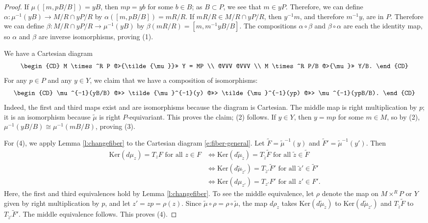 \documentclass[11pt,letterpaper,reqno]{amsart}
\newcommand{\ga}{\alpha}
\numberwithin{equation}{section}
\theoremstyle{plain}
\theoremstyle{definition}
\theoremstyle{remark}
\newcommand{\gb}{\beta}
\begin{document}
\begin{proof}
If $\mu([m, pB/B]) = yB$, then $mp = y b$ for some $b \in B$; as $B \subset P$, we see that $m \in yP$.  Therefore, we can define
$\ga: \mu^{-1}(yB) \to M/R \cap yP/R$ by $\ga([m, pB/B]) = mR/R$.   If $mR/R \in M/R \cap yP/R$,
then $y^{-1}m$, and therefore $m^{-1} y$, are in $P$.  Therefore we can define $\gb: M/R \cap yP/R \to \mu^{-1}(yB)$ by
$\gb(mR/R) = [m, m^{-1} yB/B]$.  The compositions $\ga \circ \gb$ and $\gb \circ \ga$ are each the identity map, so
$\ga$ and $\gb$ are inverse isomorphisms, proving (1).




 We have a Cartesian diagram
\begin{equation} \label{e:fiber-general}
\begin{CD}
M \times^R P @>{\tilde{\mu}}>> Y = MP \\
@VVV    @VVV \\
M \times^R P/B @>{\mu}>> Y/B.
\end{CD}
\end{equation}
For any $p \in P$ and any $y \in Y$, we claim that we have a composition of isomorphisms: 
\begin{equation} \label{e:comp-iso}
\begin{CD}
\mu^{-1}(yB/B) @>>> \tilde{\mu}^{-1}(y) @>>> \tilde{\mu}^{-1}(yp) @>>>  \mu^{-1}(ypB/B).
\end{CD}
\end{equation}
Indeed, the first and third maps exist and are isomorphisms because the diagram is Cartesian.  The middle map is
right multiplication by $p$; it is an isomorphism 
because $\tilde{\mu}$ is right $P$-equivariant.  This proves the claim; (2) follows.  If $y \in Y$, then
$y = mp$ for some $m \in M$, so by (2), $\mu^{-1}(yB/B) \cong \mu^{-1}(mB/B)$, proving (3).

For (4), we apply Lemma \ref{l:changefiber} to the Cartesian diagram \eqref{e:fiber-general}.  
Let $\tilde{F} = \tilde{\mu}^{-1}(y)$ and $\tilde{F}' = \tilde{\mu}^{-1}(y')$.
Then
\begin{align*}
\mathrm{Ker}(d\mu_{z})=T_z F \mbox{  for all  }z \in F & \Leftrightarrow \mathrm{Ker}(d\tilde{\mu}_{\tilde{z}})=T_{\tilde{z}} \tilde{F} \mbox{ for all }\tilde{z} \in \tilde{F} \\
& \Leftrightarrow \mathrm{Ker}(d\tilde{\mu}_{\tilde{z}'})=T_{\tilde{z}'} \tilde{F}' \mbox{ for all }\tilde{z}' \in \tilde{F}' \\
& \Leftrightarrow  \mathrm{Ker}(d\mu_{z'})=T_{z'} F' \mbox{  for all  }z' \in F' .
\end{align*}
Here, the first and third equivalences hold by Lemma \ref{l:changefiber}.  To see the middle equivalence, let
$\rho$ denote the map on $M \times^R P$ or $Y$ given by right multiplication by $p$, and let $z' = zp = \rho(z)$.
Since $\tilde{\mu} \circ \rho = \rho \circ \tilde{\mu}$, the map $d \rho_z$ takes
$\mathrm{Ker}(d\tilde{\mu}_{\tilde{z}})$ to $\mathrm{Ker}(d\tilde{\mu}_{\tilde{z}'})$ and $T_{\tilde{z}} \tilde{F} $
to $T_{\tilde{z}'} \tilde{F}' $.  The middle equivalence follows.  This proves (4).
\end{proof}
\end{document}
